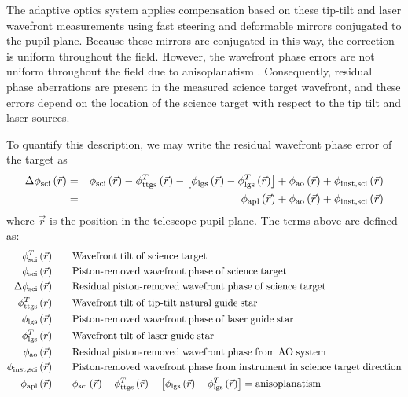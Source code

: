 The adaptive optics system applies compensation based on these
tip-tilt and laser wavefront measurements using fast steering and
deformable mirrors conjugated to the pupil plane.  Because these
mirrors are conjugated in this way, the correction is uniform
throughout the field.  However, the wavefront phase errors are not
uniform throughout the field due to anisoplanatism \cite{Fried:1982}.
Consequently, residual phase aberrations are present in the measured
science target wavefront, and these errors depend on the location of
the science target with respect to the tip tilt and laser sources.

To quantify this description, we may write the residual wavefront
phase error of the target as
\begin{eqnarray}\label{eqn:phdiff}
\Delta\phi_{\rm sci}\left(\vec{r}\right) & = & \phi_{\rm sci}\left(\vec{r}\right) - \phi^{T}_{\rm ttgs}\left(\vec{r}\right) - 
\left[\phi_{\rm lgs}\left(\vec{r}\right) - \phi^{T}_{\rm lgs}\left(\vec{r}\right)\right] + \phi_{\rm ao}\left(\vec{r}\right) + 
\phi_{\rm inst,sci}\left(\vec{r}\right) \\
& = & \phi_{\rm apl}\left(\vec{r}\right) + \phi_{\rm ao}\left(\vec{r}\right)  + \phi_{\rm inst,sci}\left(\vec{r}\right) \nonumber
\end{eqnarray}
where $\vec{r}$ is the position in the telescope pupil plane. 
The terms above are defined as: 
\begin{equation}\label{eqn:phidefs}
\begin{aligned}
\phi^{T}_{\rm sci}\left(\vec{r}\right)  \quad & \quad  
{\rm Wavefront\; tilt\; of\; science\; target}  \\
\phi_{\rm sci}\left(\vec{r}\right)  \quad & \quad  
{\rm Piston\text{-}removed\; wavefront\; phase\; of\; science\; target}  \\
\Delta\phi_{\rm sci}\left(\vec{r}\right)  \quad & \quad  
{\rm Residual\; piston\text{-}removed\; wavefront\; phase\; of\; science\; target} \\
\phi^{T}_{\rm ttgs}\left(\vec{r}\right)  \quad & \quad  
{\rm Wavefront\; tilt\; of\; tip\text{-}tilt\; natural\; guide\; star}  \\
\phi_{\rm lgs}\left(\vec{r}\right)  \quad & \quad  
{\rm Piston\text{-}removed\; wavefront\; phase\; of\; laser\; guide\; star}  \\
\phi^{T}_{\rm lgs}\left(\vec{r}\right)  \quad & \quad  
{\rm Wavefront\; tilt\; of\; laser\; guide\; star}  \\
\phi_{\rm ao}\left(\vec{r}\right)  \quad & \quad  
{\rm Residual\; piston\text{-}removed\; wavefront\; phase\; from\; AO\; system}  \\
\phi_{\rm inst,sci}\left(\vec{r}\right)  \quad & \quad  
{\rm Piston\text{-}removed\; wavefront\; phase\; from\; instrument\; in\; science\; target\; direction}  \\
\phi_{\rm apl}\left(\vec{r}\right)  \quad & \quad  \phi_{\rm sci}\left(\vec{r}\right) - \phi^{T}_{\rm ttgs}\left(\vec{r}\right) - 
\left[\phi_{\rm lgs}\left(\vec{r}\right) - \phi^{T}_{\rm lgs}\left(\vec{r}\right)\right] = 
{\rm anisoplanatism}
\end{aligned}
\end{equation}
